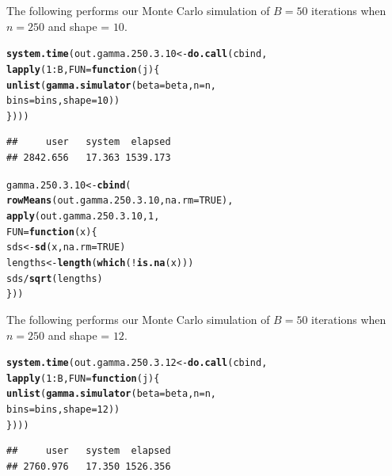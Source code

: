 \documentclass[11pt]{article}\usepackage[]{graphicx}\usepackage[]{color}
\makeatletter
\newcommand{\hlnum}[1]{\textcolor[rgb]{0.686,0.059,0.569}{#1}}%
\newcommand{\hlopt}[1]{\textcolor[rgb]{0,0,0}{#1}}%
\newcommand{\hlstd}[1]{\textcolor[rgb]{0.345,0.345,0.345}{#1}}%
\newcommand{\hlkwa}[1]{\textcolor[rgb]{0.161,0.373,0.58}{\textbf{#1}}}%
\newcommand{\hlkwb}[1]{\textcolor[rgb]{0.69,0.353,0.396}{#1}}%
\newcommand{\hlkwc}[1]{\textcolor[rgb]{0.333,0.667,0.333}{#1}}%
\newcommand{\hlkwd}[1]{\textcolor[rgb]{0.737,0.353,0.396}{\textbf{#1}}}%
\newenvironment{kframe}{%
 \def\at@end@of@kframe{}%
 \ifinner\ifhmode%
  \def\at@end@of@kframe{\end{minipage}}%
  \begin{minipage}{\columnwidth}%
 \fi\fi%
 \def\FrameCommand##1{\hskip\@totalleftmargin \hskip-\fboxsep
 \colorbox{shadecolor}{##1}\hskip-\fboxsep
     \hskip-\linewidth \hskip-\@totalleftmargin \hskip\columnwidth}%
 \MakeFramed {\advance\hsize-\width
   \@totalleftmargin\z@ \linewidth\hsize
   \@setminipage}}%
 {\par\unskip\endMakeFramed%
 \at@end@of@kframe}
\newenvironment{knitrout}{}{} %
\makeatother
\begin{document}
The following performs our Monte Carlo simulation of $B = 50$ iterations 
when $n = 250$ and shape = $10$.

\begin{knitrout}
\color{fgcolor}\begin{kframe}
\begin{alltt}
\hlkwd{system.time}\hlstd{(out.gamma.250.3.10} \hlkwb{<-} \hlkwd{do.call}\hlstd{(cbind,}
  \hlkwd{lapply}\hlstd{(}\hlnum{1}\hlopt{:}\hlstd{B,} \hlkwc{FUN} \hlstd{=} \hlkwa{function}\hlstd{(}\hlkwc{j}\hlstd{)\{}
    \hlkwd{unlist}\hlstd{(}\hlkwd{gamma.simulator}\hlstd{(}\hlkwc{beta} \hlstd{= beta,} \hlkwc{n} \hlstd{= n,}
      \hlkwc{bins} \hlstd{= bins,} \hlkwc{shape} \hlstd{=} \hlnum{10}\hlstd{))}
\hlstd{\})))}
\end{alltt}
\begin{verbatim}
##     user   system  elapsed 
## 2842.656   17.363 1539.173
\end{verbatim}
\end{kframe}
\end{knitrout}

\begin{knitrout}
\color{fgcolor}\begin{kframe}
\begin{alltt}
\hlstd{gamma.250.3.10} \hlkwb{<-} \hlkwd{cbind}\hlstd{(}
  \hlkwd{rowMeans}\hlstd{(out.gamma.250.3.10,} \hlkwc{na.rm} \hlstd{=} \hlnum{TRUE}\hlstd{),}
  \hlkwd{apply}\hlstd{(out.gamma.250.3.10,} \hlnum{1}\hlstd{,}
  \hlkwc{FUN} \hlstd{=} \hlkwa{function}\hlstd{(}\hlkwc{x}\hlstd{)\{}
    \hlstd{sds} \hlkwb{<-} \hlkwd{sd}\hlstd{(x,} \hlkwc{na.rm} \hlstd{=} \hlnum{TRUE}\hlstd{)}
    \hlstd{lengths} \hlkwb{<-} \hlkwd{length}\hlstd{(}\hlkwd{which}\hlstd{(}\hlopt{!}\hlkwd{is.na}\hlstd{(x)))}
    \hlstd{sds} \hlopt{/} \hlkwd{sqrt}\hlstd{(lengths)}
  \hlstd{\}))}
\end{alltt}
\end{kframe}
\end{knitrout}

The following performs our Monte Carlo simulation of $B = 50$ iterations 
when $n = 250$ and shape = $12$.

\begin{knitrout}
\color{fgcolor}\begin{kframe}
\begin{alltt}
\hlkwd{system.time}\hlstd{(out.gamma.250.3.12} \hlkwb{<-} \hlkwd{do.call}\hlstd{(cbind,}
  \hlkwd{lapply}\hlstd{(}\hlnum{1}\hlopt{:}\hlstd{B,} \hlkwc{FUN} \hlstd{=} \hlkwa{function}\hlstd{(}\hlkwc{j}\hlstd{)\{}
    \hlkwd{unlist}\hlstd{(}\hlkwd{gamma.simulator}\hlstd{(}\hlkwc{beta} \hlstd{= beta,} \hlkwc{n} \hlstd{= n,}
      \hlkwc{bins} \hlstd{= bins,} \hlkwc{shape} \hlstd{=} \hlnum{12}\hlstd{))}
\hlstd{\})))}
\end{alltt}
\begin{verbatim}
##     user   system  elapsed 
## 2760.976   17.350 1526.356
\end{verbatim}
\end{kframe}
\end{knitrout}
\end{document}
